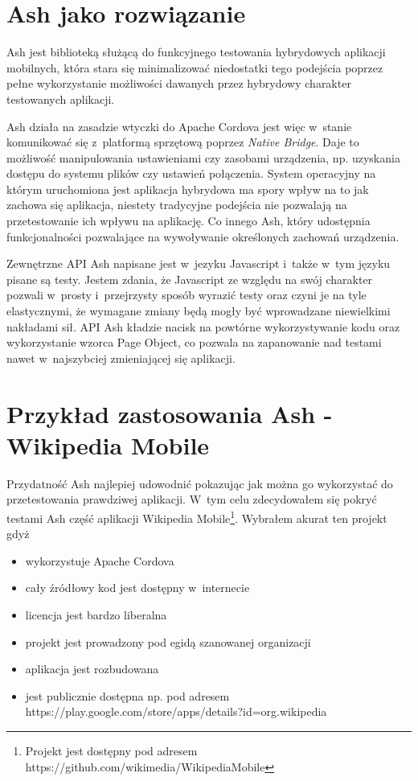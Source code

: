 \documentclass[brudnopis]{xmgr}
\begin{document}
                                                                                                                                                                 
\section{Ash jako rozwiązanie}

Ash jest biblioteką służącą do funkcyjnego testowania hybrydowych aplikacji mobilnych, która stara się minimalizować niedostatki tego podejścia poprzez pełne wykorzystanie możliwości dawanych przez hybrydowy charakter testowanych aplikacji. 

Ash działa na zasadzie wtyczki do Apache Cordova jest więc w~stanie komunikować się z~platformą sprzętową poprzez \textit{Native Bridge}. Daje to możliwość manipulowania ustawieniami czy zasobami urządzenia, np. uzyskania dostępu do systemu plików czy ustawień połączenia. System operacyjny na którym uruchomiona jest aplikacja hybrydowa ma spory wpływ na to jak zachowa się aplikacja, niestety tradycyjne podejścia nie pozwalają na przetestowanie ich wpływu na aplikację. Co innego Ash, który udostępnia funkcjonalności pozwalające na wywoływanie określonych zachowań urządzenia. 

Zewnętrzne API Ash napisane jest w~jezyku Javascript i~także w~tym języku pisane są testy. Jestem zdania, że Javascript ze względu na swój charakter pozwali w~prosty i~przejrzysty sposób wyrazić testy oraz czyni je na tyle elastycznymi, że wymagane zmiany będą mogły być wprowadzane niewielkimi nakładami sił. API Ash kładzie nacisk na powtórne wykorzystywanie kodu oraz wykorzystanie wzorca Page Object, co pozwala na zapanowanie nad testami nawet w~najszybciej zmieniającej się aplikacji. 

\section{Przykład zastosowania Ash - Wikipedia Mobile}

Przydatność Ash najlepiej udowodnić pokazując jak można go wykorzystać do przetestowania prawdziwej aplikacji. W~tym celu zdecydowałem się pokryć testami Ash część aplikacji Wikipedia Mobile\footnote{Projekt jest dostępny pod adresem https://github.com/wikimedia/WikipediaMobile}. Wybrałem akurat ten projekt gdyż

\begin{itemize}
  \item wykorzystuje Apache Cordova
  \item cały źródłowy kod jest dostępny w~internecie
  \item licencja jest bardzo liberalna
  \item projekt jest prowadzony pod egidą szanowanej organizacji
  \item aplikacja jest rozbudowana
  \item jest publicznie dostępna np. pod adresem https://play.google.com/store/apps/details?id=org.wikipedia
\end{itemize}
\end{document}
